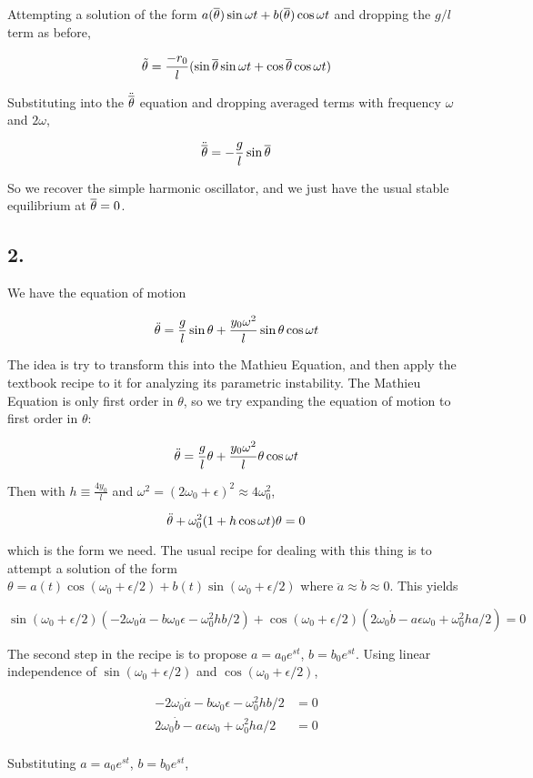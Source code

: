 \documentclass[12pt]{article}
\begin{document}
Attempting a solution of the form \( a(\overline{\theta})\sin\omega t + b(\overline{\theta})\cos\omega t\) and dropping the \(g/l\) term as before,

\[\tilde{\theta} =  \frac{-r_0}{l}(\sin\overline{\theta}\sin\omega t + \cos\overline{\theta}\cos\omega t)
\]

Substituting into the \(\ddot{\overline{\theta}}\) equation and dropping averaged terms with frequency \(\omega\) and \(2\omega\),

\[\ddot{\overline{\theta}} = -\frac{g}{l}\sin\overline{\theta}
\]

So we recover the simple harmonic oscillator, and we just have the usual stable equilibrium at \(\overline{\theta} = 0\).

\pagebreak

\subsection*{2.}

We have the equation of motion

\[\ddot{\theta} = \frac{g}{l}\sin\theta + \frac{y_0\omega^2}{l}\sin\theta\cos\omega t
\]

The idea is try to transform this into the Mathieu  Equation, and then apply the textbook recipe to it for analyzing its parametric instability. The Mathieu Equation is only first order in \(\theta\), so we try expanding the equation of motion to first order in \(\theta\):

\[\ddot{\theta} = \frac{g}{l}\theta + \frac{y_0\omega^2}{l}\theta\cos\omega t
\]

Then with \(h\equiv \frac{4y_0}{l}\) and \(\omega^2 = (2\omega_0+\epsilon)^2 \approx 4\omega_0^2\),

\[\ddot{\theta} + \omega_0^2(1+h\cos\omega t)\theta = 0
\]

\newcommand{\coswne}{\cos(\omega_0 + \epsilon/2)}
\newcommand{\sinwne}{\sin(\omega_0 + \epsilon/2)}

which is the form we need. The usual recipe for dealing with this thing is to attempt a solution of the form \(\theta = a(t)\coswne + b(t)\sinwne \) where \(\ddot{a}\approx\ddot{b}\approx0\). This  yields

\[ \sinwne(-2\omega_0\dot{a} - b\omega_0\epsilon - \omega_0^2hb/2) + \coswne(2\omega_0\dot{b}-a\epsilon\omega_0+\omega_0^2ha/2) = 0
\]

The second step in the recipe is to propose \(a = a_0e^{st}\), \(b = b_0e^{st}\). Using linear independence of \(\sinwne\) and \(\coswne\),

\begin{align*}
-2\omega_0\dot{a} - b\omega_0\epsilon - \omega_0^2hb/2 &= 0 \\
2\omega_0\dot{b}-a\epsilon\omega_0+\omega_0^2ha/2 &= 0 \\
\end{align*}

Substituting  \(a = a_0e^{st}\), \(b = b_0e^{st}\),
\end{document}
